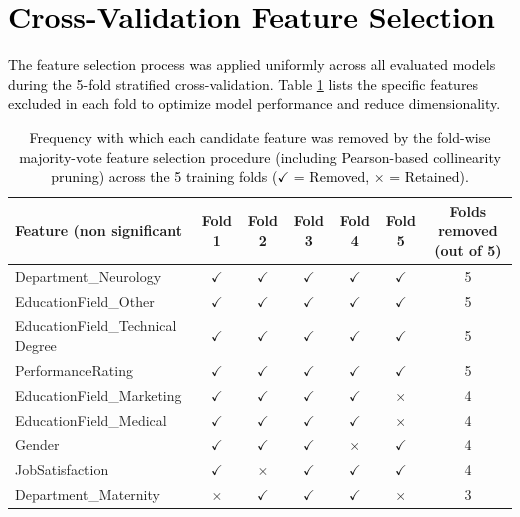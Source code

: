 \documentclass[a4paper,fleqn]{cas-sc}
\begin{document}
\section{\textcolor{black}{Cross-Validation Feature Selection}}
\label{sec:appendix_features}
\textcolor{black}{The feature selection process was applied uniformly across all evaluated models during the 5-fold stratified cross-validation. Table \ref{tab:removed_features} lists the specific features excluded in each fold to optimize model performance and reduce dimensionality.}


\begin{table}[pos=h]
\footnotesize
    \centering
    \caption{\textcolor{black}{Frequency with which each candidate feature was removed by the fold-wise majority-vote feature selection procedure (including Pearson-based collinearity
pruning) across the 5 training folds ($\checkmark$ = Removed, $\times$ = Retained).}}
    \label{tab:removed_features}
    \begin{tabular}{@{}lcccccc@{}}
        \toprule
        \textbf{Feature (non significant} & \textbf{Fold 1} & \textbf{Fold 2} & \textbf{Fold 3} & \textbf{Fold 4} & \textbf{Fold 5} & \textbf{Folds removed (out of 5)} \\
        \midrule
        Department\_Neurology & $\checkmark$ & $\checkmark$ & $\checkmark$ & $\checkmark$ & $\checkmark$ & 5 \\
        EducationField\_Other & $\checkmark$ & $\checkmark$ & $\checkmark$ & $\checkmark$ & $\checkmark$ & 5 \\
        EducationField\_Technical Degree & $\checkmark$ & $\checkmark$ & $\checkmark$ & $\checkmark$ & $\checkmark$ & 5 \\
        PerformanceRating & $\checkmark$ & $\checkmark$ & $\checkmark$ & $\checkmark$ & $\checkmark$ & 5 \\
        EducationField\_Marketing & $\checkmark$ & $\checkmark$ & $\checkmark$ & $\checkmark$ & $\times$ & 4 \\
        EducationField\_Medical & $\checkmark$ & $\checkmark$ & $\checkmark$ & $\checkmark$ & $\times$ & 4 \\
        Gender & $\checkmark$ & $\checkmark$ & $\checkmark$ & $\times$ & $\checkmark$ & 4 \\
        JobSatisfaction & $\checkmark$ & $\times$ & $\checkmark$ & $\checkmark$ & $\checkmark$ & 4 \\
        Department\_Maternity & $\times$ & $\checkmark$ & $\checkmark$ & $\checkmark$ & $\times$ & 3 \\

\end{tabular}
\end{table}
\end{document}
